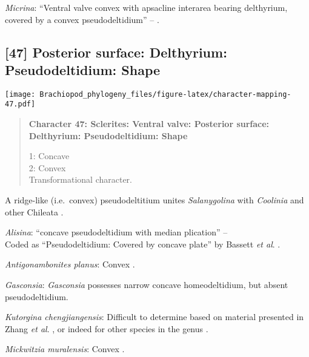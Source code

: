 \documentclass[openany]{book}
\theoremstyle{definition}
\theoremstyle{definition}
\theoremstyle{definition}
\theoremstyle{remark}
\begin{document}
\hypertarget{Micrina-coding-46}{}
\emph{Micrina}: ``Ventral valve convex with apsacline interarea bearing
delthyrium, covered by a convex pseudodeltidium'' --
\citet{Holmer2008TheEarly}.

\subsection*{{[}47{]} Posterior surface: Delthyrium: Pseudodeltidium:
Shape}\label{posterior-surface-delthyrium-pseudodeltidium-shape}

\texttt{[image: Brachiopod\_phylogeny\_files/figure-latex/character-mapping-47.pdf]}

\begin{quote}
\textbf{Character 47: Sclerites: Ventral valve: Posterior surface:
Delthyrium: Pseudodeltidium: Shape}

1: Concave\\
2: Convex\\
Transformational character.
\end{quote}

A ridge-like (i.e.~convex) pseudodeltitium unites \emph{Salanygolina}
with \emph{Coolinia} and other Chileata
\citep[p.~6]{Holmer2009Theenigmatic}.

\hypertarget{Alisina-coding-47}{}
\emph{Alisina}: ``concave pseudodeltidium with median plication'' --
\citet{Williams2000LinguliformeaCraniiformea}\\
Coded as ``Pseudodeltidium: Covered by concave plate'' by Bassett
\emph{et al}. \citeyearpar{Bassett2001Functionalmorphology}.

\hypertarget{Antigonambonites_planus-coding-47}{}
\emph{Antigonambonites planus}: Convex \citep[fig.
508]{Williams2000LinguliformeaCraniiformea}.

\hypertarget{Gasconsia-coding-47}{}
\emph{Gasconsia}: \emph{Gasconsia} possesses narrow concave
homeodeltidium, but absent pseudodeltidium.

\hypertarget{Kutorgina_chengjiangensis-coding-47}{}
\emph{Kutorgina chengjiangensis}: Difficult to determine based on
material presented in Zhang \emph{et al}.
\citeyearpar{Zhang2007Rhynchonelliformeanbrachiopods}, or indeed for
other species in the genus
\citep[e.g.][]{Williams2000LinguliformeaCraniiformea, Skovsted2005EarlyCambrian, Holmer2018Theattachment}.

\hypertarget{Mickwitzia_muralensis-coding-47}{}
\emph{Mickwitzia muralensis}: Convex \citep[see][fig.
4B]{Balthasar2004Shellstructure}.
\end{document}
